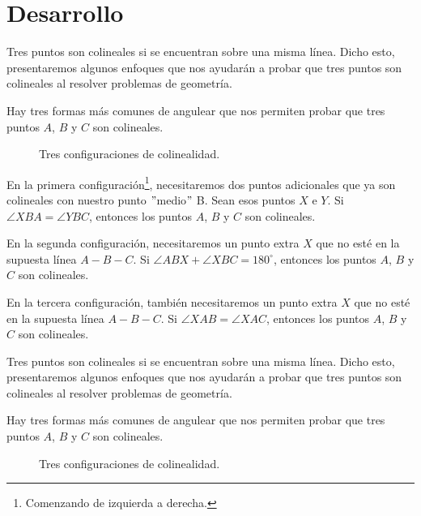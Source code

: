 \section{Desarrollo}

\begin{figure}[htb]
    \centering
\end{figure}

Tres puntos son colineales si se encuentran sobre una misma línea.
Dicho esto, presentaremos algunos enfoques que nos ayudarán a probar que tres puntos son colineales al resolver problemas de geometría.

Hay tres formas más comunes de angulear que nos permiten probar que tres puntos $A$, $B$ y $C$ son colineales.

\begin{figure}[htb]
    \centering
    \caption{Tres configuraciones de colinealidad.}
\end{figure}

En la primera configuración\footnote{Comenzando de izquierda a derecha.}, necesitaremos dos puntos adicionales que ya son colineales con nuestro punto \("\)medio\("\) B.
Sean esos puntos $X$ e $Y$.
Si $\angle XBA = \angle YBC$, entonces los puntos $A$, $B$ y $C$ son colineales.

En la segunda configuración, necesitaremos un punto extra $X$ que no esté en la supuesta línea $A - B - C$.
Si $\angle ABX + \angle XBC = 180^\circ$, entonces los puntos $A$, $B$ y $C$ son colineales.

En la tercera configuración, también necesitaremos un punto extra $X$ que no esté en la supuesta línea $A - B - C$.
Si $\angle XAB = \angle XAC$, entonces los puntos $A$, $B$ y $C$ son colineales.%
\begin{figure}[htb]
    \centering
\end{figure}

Tres puntos son colineales si se encuentran sobre una misma línea.
Dicho esto, presentaremos algunos enfoques que nos ayudarán a probar que tres puntos son colineales al resolver problemas de geometría.

Hay tres formas más comunes de angulear que nos permiten probar que tres puntos $A$, $B$ y $C$ son colineales.

\begin{figure}[htb]
    \centering
    \caption{Tres configuraciones de colinealidad.}
\end{figure}

